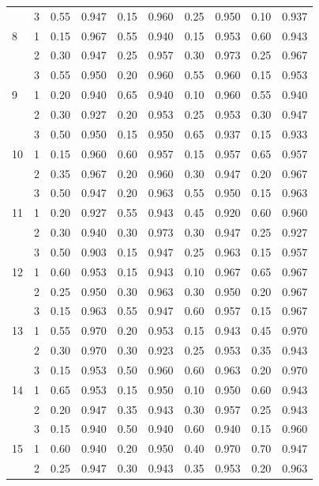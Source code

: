 \begin{longtable}{llcccccccc}
   & 3 & 0.55 & 0.947 & 0.15 & 0.960 & 0.25 & 0.950 & 0.10 & 0.937 \\ 
  8 & 1 & 0.15 & 0.967 & 0.55 & 0.940 & 0.15 & 0.953 & 0.60 & 0.943 \\ 
   & 2 & 0.30 & 0.947 & 0.25 & 0.957 & 0.30 & 0.973 & 0.25 & 0.967 \\ 
   & 3 & 0.55 & 0.950 & 0.20 & 0.960 & 0.55 & 0.960 & 0.15 & 0.953 \\ 
  9 & 1 & 0.20 & 0.940 & 0.65 & 0.940 & 0.10 & 0.960 & 0.55 & 0.940 \\ 
   & 2 & 0.30 & 0.927 & 0.20 & 0.953 & 0.25 & 0.953 & 0.30 & 0.947 \\ 
   & 3 & 0.50 & 0.950 & 0.15 & 0.950 & 0.65 & 0.937 & 0.15 & 0.933 \\ 
  10 & 1 & 0.15 & 0.960 & 0.60 & 0.957 & 0.15 & 0.957 & 0.65 & 0.957 \\ 
   & 2 & 0.35 & 0.967 & 0.20 & 0.960 & 0.30 & 0.947 & 0.20 & 0.967 \\ 
   & 3 & 0.50 & 0.947 & 0.20 & 0.963 & 0.55 & 0.950 & 0.15 & 0.963 \\ 
  11 & 1 & 0.20 & 0.927 & 0.55 & 0.943 & 0.45 & 0.920 & 0.60 & 0.960 \\ 
   & 2 & 0.30 & 0.940 & 0.30 & 0.973 & 0.30 & 0.947 & 0.25 & 0.927 \\ 
   & 3 & 0.50 & 0.903 & 0.15 & 0.947 & 0.25 & 0.963 & 0.15 & 0.957 \\ 
  12 & 1 & 0.60 & 0.953 & 0.15 & 0.943 & 0.10 & 0.967 & 0.65 & 0.967 \\ 
   & 2 & 0.25 & 0.950 & 0.30 & 0.963 & 0.30 & 0.950 & 0.20 & 0.967 \\ 
   & 3 & 0.15 & 0.963 & 0.55 & 0.947 & 0.60 & 0.957 & 0.15 & 0.967 \\ 
  13 & 1 & 0.55 & 0.970 & 0.20 & 0.953 & 0.15 & 0.943 & 0.45 & 0.970 \\ 
   & 2 & 0.30 & 0.970 & 0.30 & 0.923 & 0.25 & 0.953 & 0.35 & 0.943 \\ 
   & 3 & 0.15 & 0.953 & 0.50 & 0.960 & 0.60 & 0.963 & 0.20 & 0.970 \\ 
  14 & 1 & 0.65 & 0.953 & 0.15 & 0.950 & 0.10 & 0.950 & 0.60 & 0.943 \\ 
   & 2 & 0.20 & 0.947 & 0.35 & 0.943 & 0.30 & 0.957 & 0.25 & 0.943 \\ 
   & 3 & 0.15 & 0.940 & 0.50 & 0.940 & 0.60 & 0.940 & 0.15 & 0.960 \\ 
  15 & 1 & 0.60 & 0.940 & 0.20 & 0.950 & 0.40 & 0.970 & 0.70 & 0.947 \\ 
   & 2 & 0.25 & 0.947 & 0.30 & 0.943 & 0.35 & 0.953 & 0.20 & 0.963 \\ 

\end{longtable}
